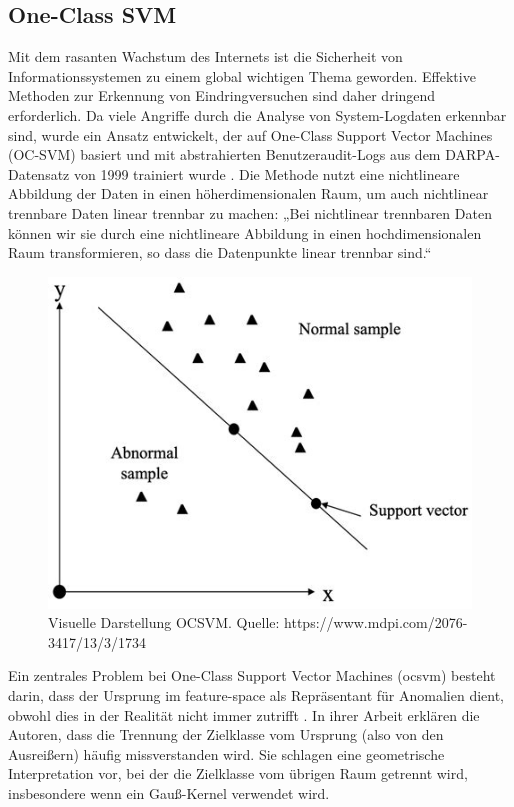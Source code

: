 \documentclass[a4paper,12pt]{article}
\begin{document}
	\subsection{One-Class SVM}
	Mit dem rasanten Wachstum des Internets ist die Sicherheit von Informationssystemen zu einem global wichtigen Thema geworden. Effektive Methoden zur Erkennung von Eindringversuchen sind daher dringend erforderlich. Da viele Angriffe durch die Analyse von System-Logdaten erkennbar sind, wurde ein Ansatz entwickelt, der auf One-Class Support Vector Machines (OC-SVM) basiert und mit abstrahierten Benutzeraudit-Logs aus dem DARPA-Datensatz von 1999 trainiert wurde \cite{li2003improving}. Die Methode nutzt eine nichtlineare Abbildung der Daten in einen höherdimensionalen Raum, um auch nichtlinear trennbare Daten linear trennbar zu machen:
	„Bei nichtlinear trennbaren Daten können wir sie durch eine nichtlineare Abbildung in einen hochdimensionalen Raum transformieren, so dass die Datenpunkte linear trennbar sind.“
	\\[0.5em]
	\begin{figure}
		\centering
		\includegraphics[width=0.7\linewidth]{screenshot006}
		\caption{Visuelle Darstellung  OCSVM. Quelle: https://www.mdpi.com/2076-3417/13/3/1734}
		\label{fig:screenshot006}
	\end{figure}
	Ein zentrales Problem bei One-Class Support Vector Machines (\gls{ocsvm}) besteht darin, dass der Ursprung im \gls{feature-space} als Repräsentant für Anomalien dient, obwohl dies in der Realität nicht immer zutrifft \cite{bounsiar2025oneclass}. In ihrer Arbeit erklären die Autoren, dass die Trennung der Zielklasse vom Ursprung (also von den Ausreißern) häufig missverstanden wird. Sie schlagen eine geometrische Interpretation vor, bei der die Zielklasse vom übrigen Raum getrennt wird, insbesondere wenn ein Gauß-Kernel verwendet wird.
	
\end{document}
